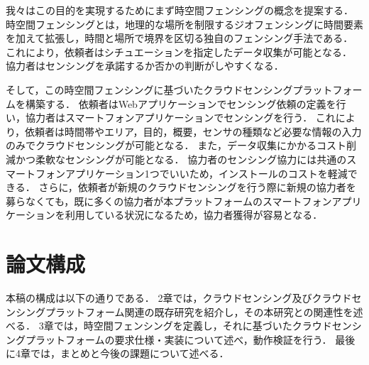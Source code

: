 我々はこの目的を実現するためにまず時空間フェンシングの概念を提案する．
時空間フェンシングとは，地理的な場所を制限するジオフェンシングに時間要素を加えて拡張し，時間と場所で境界を区切る独自のフェンシング手法である．
これにより，依頼者はシチュエーションを指定したデータ収集が可能となる．
協力者はセンシングを承諾するか否かの判断がしやすくなる．

そして，この時空間フェンシングに基づいたクラウドセンシングプラットフォームを構築する．
依頼者はWebアプリケーションでセンシング依頼の定義を行い，協力者はスマートフォンアプリケーションでセンシングを行う．
これにより，依頼者は時間帯やエリア，目的，概要，センサの種類など必要な情報の入力のみでクラウドセンシングが可能となる．
また，データ収集にかかるコスト削減かつ柔軟なセンシングが可能となる．
協力者のセンシング協力には共通のスマートフォンアプリケーション1つでいいため，インストールのコストを軽減できる．
さらに，依頼者が新規のクラウドセンシングを行う際に新規の協力者を募らなくても，既に多くの協力者が本プラットフォームのスマートフォンアプリケーションを利用している状況になるため，協力者獲得が容易となる．


\section{論文構成}
\label{sec:presentation}

本稿の構成は以下の通りである．
2章では，クラウドセンシング及びクラウドセンシングプラットフォーム関連の既存研究を紹介し，その本研究との関連性を述べる．
3章では，時空間フェンシングを定義し，それに基づいたクラウドセンシングプラットフォームの要求仕様・実装について述べ，動作検証を行う．
最後に4章では，まとめと今後の課題について述べる．

